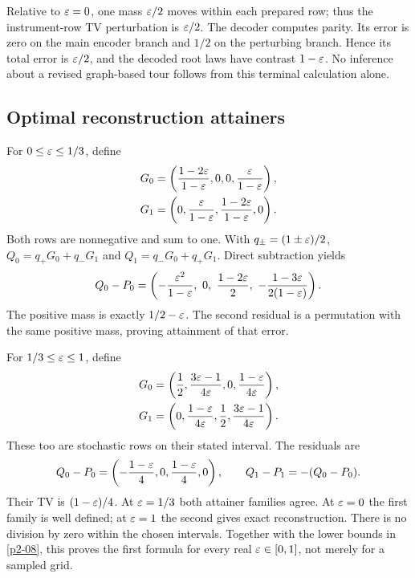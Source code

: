 Relative to \(\varepsilon=0\), one mass \(\varepsilon/2\) moves within each prepared row; thus the instrument-row TV perturbation is \(\varepsilon/2\). The decoder computes parity. Its error is zero on the main encoder branch and \(1/2\) on the perturbing branch. Hence its total error is \(\varepsilon/2\), and the decoded root laws have contrast \(1-\varepsilon\). No inference about a revised graph-based tour follows from this terminal calculation alone.

\subsection{Optimal reconstruction attainers}
For \(0\le\varepsilon\le1/3\), define
\begin{align}
 G_0&=\left(\frac{1-2\varepsilon}{1-\varepsilon},0,0,\frac{\varepsilon}{1-\varepsilon}\right),\label{eq:attainer-low0}\\
 G_1&=\left(0,\frac{\varepsilon}{1-\varepsilon},\frac{1-2\varepsilon}{1-\varepsilon},0\right).\label{eq:attainer-low1}
\end{align}
Both rows are nonnegative and sum to one. With \(q_\pm=(1\pm\varepsilon)/2\), \(Q_0=q_+G_0+q_-G_1\) and \(Q_1=q_-G_0+q_+G_1\). Direct subtraction yields
\begin{equation}\label{eq:low-residual}
 Q_0-P_0=\left(
 -\frac{\varepsilon^2}{1-\varepsilon},\ 0,\
 \frac{1-2\varepsilon}{2},\
 -\frac{1-3\varepsilon}{2(1-\varepsilon)}\right).
\end{equation}
The positive mass is exactly \(1/2-\varepsilon\). The second residual is a permutation with the same positive mass, proving attainment of that error.

For \(1/3\le\varepsilon\le1\), define
\begin{align}
 G_0&=\left(\frac12,\frac{3\varepsilon-1}{4\varepsilon},0,\frac{1-\varepsilon}{4\varepsilon}\right),\label{eq:attainer-high0}\\
 G_1&=\left(0,\frac{1-\varepsilon}{4\varepsilon},\frac12,\frac{3\varepsilon-1}{4\varepsilon}\right).\label{eq:attainer-high1}
\end{align}
These too are stochastic rows on their stated interval. The residuals are
\begin{equation}\label{eq:high-residual}
 Q_0-P_0=\left(-\frac{1-\varepsilon}{4},0,\frac{1-\varepsilon}{4},0\right),
 \qquad Q_1-P_1=-(Q_0-P_0).
\end{equation}
Their TV is \((1-\varepsilon)/4\). At \(\varepsilon=1/3\) both attainer families agree. At \(\varepsilon=0\) the first family is well defined; at \(\varepsilon=1\) the second gives exact reconstruction. There is no division by zero within the chosen intervals. Together with the lower bounds in \cref{p2-08}, this proves the first formula for every real \(\varepsilon\in[0,1]\), not merely for a sampled grid.

